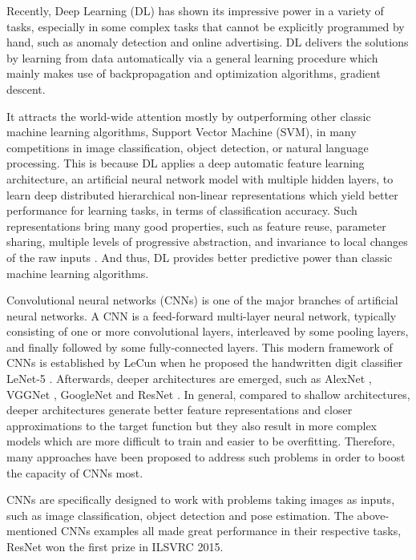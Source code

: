 \documentclass[a4paper,12pt]{article}
\begin{document}
Recently, Deep Learning (DL) has shown its impressive power in a variety of tasks, especially in some complex tasks that cannot be explicitly programmed by hand, such as anomaly detection and online advertising. DL delivers the solutions by learning from data automatically via a general learning procedure which mainly makes use of backpropagation and optimization algorithms, \eg gradient descent.

It attracts the world-wide attention mostly by outperforming other classic machine learning algorithms, \eg Support Vector Machine (SVM),  in many competitions in image classification, object detection, or natural language processing. This is because DL applies a deep automatic feature learning architecture, \ie an artificial neural network model with multiple hidden layers, to learn deep distributed hierarchical non-linear representations which yield better performance for learning tasks, \eg in terms of classification accuracy. Such representations bring many good properties, such as feature reuse, parameter sharing,  multiple levels of progressive abstraction, and invariance to local changes of the raw inputs  \cite{6472238}. And thus, DL provides better predictive power than classic machine learning algorithms.

Convolutional neural networks (CNNs) is one of the major branches of artificial neural networks. A CNN is a feed-forward multi-layer neural network, typically consisting of one or more convolutional layers,  interleaved by some pooling layers, and finally followed by some fully-connected layers. This modern framework of CNNs is established by LeCun \etal when he proposed the handwritten digit classifier LeNet-5 \cite{726791}. Afterwards, deeper architectures are emerged,  such as AlexNet \cite{DBLP:Russakovsky14}, VGGNet \cite{DBLP:SimonyanZ14a}, GoogleNet \cite{DBLP:SzegedyLJSRAEVR14} and ResNet \cite{DBLP:HeZRS15}. In general, compared to shallow architectures, deeper architectures generate better feature representations and closer approximations to the target function but they also result in more complex models which are more difficult to train and easier to be overfitting. Therefore, many approaches have been proposed to address such problems in order to boost the capacity of CNNs most.

CNNs are specifically designed to work with problems taking images as inputs, such as image classification, object detection and pose estimation. The above-mentioned CNNs examples all made great performance in their respective tasks, \eg ResNet won the first prize in ILSVRC 2015.
\end{document}
